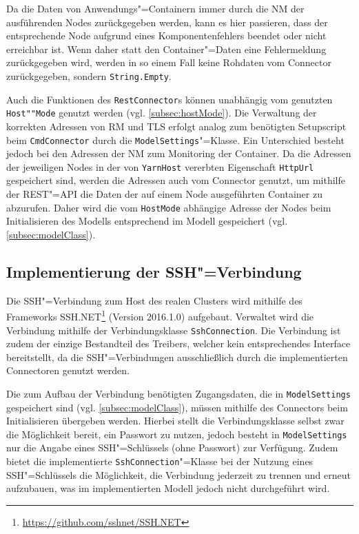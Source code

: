 Da die Daten von Anwendungs"=Containern immer durch die \gls{NM} der ausführenden Nodes zurückgegeben werden, kann es hier passieren, dass der entsprechende Node aufgrund eines Komponentenfehlers beendet oder nicht erreichbar ist.
Wenn daher statt den Container"=Daten eine Fehlermeldung zurückgegeben wird, werden in so einem Fall keine Rohdaten vom Connector zurückgegeben, sondern \texttt{String.Empty}.

Auch die Funktionen des \texttt{RestConnector}s können unabhängig vom genutzten \texttt{Host""Mode} genutzt werden (vgl. \cref{subsec:hostMode}).
Die Verwaltung der korrekten Adressen von \gls{RM} und \gls{TLS} erfolgt analog zum benötigten Setupscript beim \texttt{CmdConnector} durch die \texttt{ModelSettings}"=Klasse.
Ein Unterschied besteht jedoch bei den Adressen der \gls{NM} zum Monitoring der Container.
Da die Adressen der jeweiligen Nodes in der von \texttt{YarnHost} vererbten Eigenschaft \texttt{HttpUrl} gespeichert sind, werden die Adressen auch vom Connector genutzt, um mithilfe der REST"=API die Daten der auf einem Node ausgeführten Container zu abzurufen.
Daher wird die vom \texttt{HostMode} abhängige Adresse der Nodes beim Initialisieren des Modells entsprechend im Modell gespeichert (vgl. \cref{subsec:modelClass}).

\subsection{Implementierung der SSH"=Verbindung}
\label{subsec:sshConnection}

Die SSH"=Verbindung zum Host des realen Clusters wird mithilfe des Frameworks SSH.NET\footnote{\url{https://github.com/sshnet/SSH.NET}} (Version 2016.1.0) aufgebaut.
Verwaltet wird die Verbindung mithilfe der Verbindungsklasse \texttt{SshConnection}.
Die Verbindung ist zudem der einzige Bestandteil des Treibers, welcher kein entsprechendes Interface bereitstellt, da die SSH"=Verbindungen ausschließlich durch die implementierten Connectoren genutzt werden.

Die zum Aufbau der Verbindung benötigten Zugangsdaten, die in \texttt{ModelSettings} gespeichert sind (vgl. \cref{subsec:modelClass}), müssen mithilfe des Connectors beim Initialisieren übergeben werden.
Hierbei stellt die Verbindungsklasse selbst zwar die Möglichkeit bereit, ein Passwort zu nutzen, jedoch besteht in \texttt{ModelSettings} nur die Angabe eines SSH"=Schlüssels (ohne Passwort) zur Verfügung.
Zudem bietet die implementierte \texttt{SshConnection}"=Klasse bei der Nutzung eines SSH"=Schlüssels die Möglichkeit, die Verbindung jederzeit zu trennen und erneut aufzubauen, was im implementierten Modell jedoch nicht durchgeführt wird.

